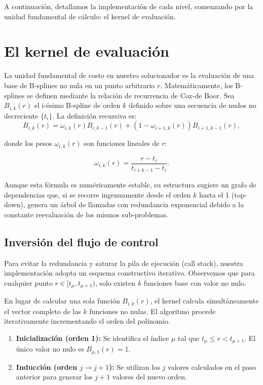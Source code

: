 \documentclass[12pt, a4paper, oneside, spanish]{article}
\begin{document}
A continuación, detallamos la implementación de cada nivel, comenzando por la unidad fundamental de cálculo: el kernel de evaluación.

\section{El kernel de evaluación}

La unidad fundamental de costo en nuestro solucionador es la evaluación de una base de B-splines no nula en un punto arbitrario \( r \). Matemáticamente, los B-splines se definen mediante la relación de recurrencia de Cox-de Boor. Sea \( B_{i,k}(r) \) el i-ésimo B-spline de orden \( k \) definido sobre una secuencia de nudos no decreciente \( \{t_i\} \). La definición recursiva es:
\begin{equation}
\label{eq:cox-deboor2}
B_{i,k}(r) = \omega_{i,k}(r) B_{i,k-1}(r) + (1-\omega_{i+1,k}(r))B_{i+1,k-1}(r),
\end{equation}

donde los pesos \( \omega_{i,k}(r) \) son funciones lineales de \( r \):

\begin{equation}
\label{eq:cdb-weights}
\omega_{i,k}(r) = \frac{r-t_i}{t_{i+k-1}-t_i}.
\end{equation}

Aunque esta fórmula es numéricamente estable, su estructura sugiere un grafo de dependencias que, si se recorre ingenuamente desde el orden \( k \) hasta el 1 (top-down), genera un árbol de llamadas con redundancia exponencial debido a la constante reevaluación de los mismos sub-problemas.

\subsection{Inversión del flujo de control}

Para evitar la redundancia y saturar la pila de ejecución (call stack), nuestra implementación adopta un esquema constructivo iterativo. Observemos que para cualquier punto \( r \in [t_{\mu}, t_{\mu + 1}) \), solo existen \( k \) funciones base con valor no nulo.

En lugar de calcular una sola función \( B_{i,k}(r) \), el kernel calcula simultáneamente el vector completo de las \( k \) funciones no nulas. El algoritmo procede iterativamente incrementando el orden del polinomio.

\begin{enumerate}
\item \textbf{Inicialización (orden 1):} Se identifica el índice \( \mu \) tal que \( t_{\mu} \leq r < t_{\mu + 1} \). El único valor no nulo es \( B_{\mu,1}(r) = 1 \).
\item \textbf{Inducción (orden \( j \to j+1 \)):} Se utilizan los \( j \) valores calculados en el paso anterior para generar los \( j+1 \) valores del nuevo orden.
\end{enumerate}
\end{document}
